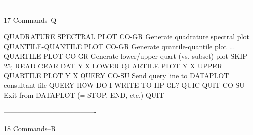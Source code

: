 ----------------------------------------
 
17
Commands--Q
 
QUADRATURE SPECTRAL PLOT    CO-GR Generate quadrature spectral plot
QUANTILE-QUANTILE PLOT      CO-GR Generate quantile-quantile plot
... QUARTILE PLOT           CO-GR Generate lower/upper quart (vs. subset) plot
                                  SKIP 25; READ GEAR.DAT Y X
                                  LOWER QUARTILE PLOT Y X
                                  UPPER QUARTILE PLOT Y X
QUERY                       CO-SU Send query line to DATAPLOT consultant file
                                  QUERY HOW DO I WRITE TO HP-GL?
QUIC
QUIT                        CO-SU Exit from DATAPLOT (= STOP, END, etc.)
                                  QUIT
 
----------------------------------------
 
18
Commands--R
 

